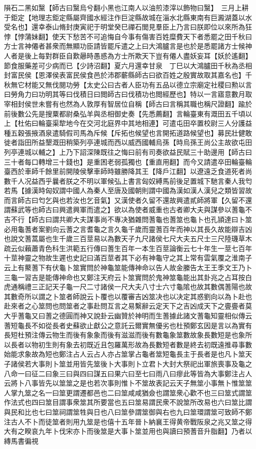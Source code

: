 隕石二黑如黳【師古曰黳烏兮翻小黑也江南人以油煎漆滓以飾物曰黳】　三月上耕于鉅定【地理志鉅定縣屬齊國水經注作巨淀縣故城在淄水北縣東南有巨澱湖蓋以水受名也】還幸泰山脩封庚寅祀于明堂癸巳禪石閭見羣臣上乃言曰朕即位以來所為狂悖【悖蒲妹翻】使天下愁苦不可追悔自今事有傷害百姓糜費天下者悉罷之田千秋曰方士言神僊者甚衆而無顯功臣請皆罷斥遣之上曰大鴻臚言是也於是悉罷諸方士候神人者是後上每對群臣自歎曏時愚惑為方士所欺天下豈有僊人盡妖妄耳【妖於遙翻】節食服藥差可少病而已【少詩沼翻】夏六月還幸甘泉　丁巳以大鴻臚田千秋為丞相封富民侯【恩澤侯表富民侯食邑於沛郡蘄縣師古曰欲百姓之殷實故取其嘉名也】千秋無它材能又無伐閱功勞【太史公曰古者人臣功有五品以德立宗廟定社稷曰勲以言曰勞角力曰功明其等曰伐積日曰閲師古曰伐積功也閲經歷也】特以一言寤意數月取宰相封侯世未嘗有也然為人敦厚有智居位自稱【師古曰言稱其職也稱尺證翻】踰於前後數公先是搜粟都尉桑弘羊與丞相御史奏【先悉薦翻】言輪臺東有溉田五千頃以上【杜佑曰輪臺渠犂地今在交河北庭界中其地相連】可遣屯田卒置校尉三人分護益種五穀張掖酒泉遣騎假司馬為斥候【斥拓也候望也言開拓道路候望也】募民壯健敢徙者詣田所益墾溉田稍築列亭連城而西以威西國輔烏孫【時烏孫王尚公主故欲屯田列亭連城以輔之】上乃下詔深陳既往之悔曰前有司奏欲益民賦三十助邊用【師古曰三十者每口轉增三十錢也】是重困老弱孤獨也【重直用翻】而今又請遣卒田輪臺輪臺西於車師千餘里前開陵侯擊車師時雖勝降其王【降戶江翻】以遼遠乏食道死者尚數千人况益西乎曩者朕之不明以軍候弘上書言匈奴縛馬前後足置城下馳言秦人我匄若馬【據漢時匈奴謂中國人為秦人至唐及國朝則謂中國為漢如漢人漢兒之類皆習故而言師古曰匄乞與也若汝也乞音氣】又漢使者久留不還故興遣貳師將軍【久留不還謂蘇武等也師古曰興遣興軍而遣之】欲以為使者威重也古者卿大夫與謀參以蓍龜不吉不行【師古曰謂共卿大夫謀事尚不專决猶雜問蓍龜也蓍筮也龜卜也孔頴達曰卜筮必用龜蓍者案劉向云蓍之言耆龜之言久龜千歲而靈蓍百年而神以其長久故能辯吉凶也說文蓍蒿屬也生千歲三百莖易以為數天子九尺諸侯七尺大夫五尺士三尺陸璣草木疏云似藾蕭青色科生洪範五行傳曰蓍生百年一本生百莖論衡云七十年生一莖七百年十莖神靈之物故生遲也史記曰滿百莖者其下必有神龜守之其上常有雲氣覆之淮南子云上有藂蓍下有伏龜卜筮實問於神龜筮能傳神命以告人故金縢告太王王季文王乃卜三龜一習吉是能傳神命也又鄭注天府云卜筮實問於鬼神筮龜能出其卦兆之占耳按白虎通稱禮三正記天子龜一尺二寸諸侯一尺大夫八寸士六寸龜隂也故其數偶蓍陽也故其數奇所以謂之卜筮者師說云卜覆也以覆審吉凶筮决也以决定其惑劉向以為卜赴也赴來者之心筮問也問筮者之事赴問互言之易繫辭云定天下之吉凶成天下之亹亹者莫大乎蓍龜又曰蓍之德圓而神又說卦云幽贊於神明而生蓍據此諸文蓍龜知靈相似傳云蓍短龜長不如從長者史蘇欲止獻公之意託云爾實無優劣也杜預鄭玄因是言以為實有長短杜預注傳云物生而後有象象而後有滋滋而後有數龜象筮數故象長數短是也象所以長者以物初生則有象去初既近且包羅萬形故為長數短者數是終去初既遠推尋事數始能求象故為短也鄭注占人云占人亦占筮掌占龜者筮短龜長主于長者是也凡卜筮天子諸侯若大事則卜筮並用皆先筮後卜大事則卜立君卜大封大祭祀出軍旅喪事及龜之八命一曰征二曰象三曰與四曰謀五曰果六曰至七曰雨八曰瘳此等皆為大事鄭注占人云將卜八事皆先以筮筮之是也若次事則惟卜不筮故表記云天子無筮小事無卜惟筮筮人掌九筮之名一曰筮更謂遷都邑也二曰筮咸咸猶僉也謂筮衆心歡不也三曰筮式謂筮作法式也四曰筮目謂事衆筮其所要當也五曰筮易謂民衆不說筮所改易也六曰筮比謂與民和比也七曰筮祠謂筮牲與日也八曰筮參謂筮御與右也九曰筮環謂筮可致師不鄭注古人不卜而徒筮者則用九筮是也僖十五年晉卜納襄王得黄帝戰阪泉之兆又筮之得大有之睽哀九年卜伐宋亦卜而後筮是大事卜筮並用也與讀曰預蓍音升脂翻】乃者以縳馬書徧視